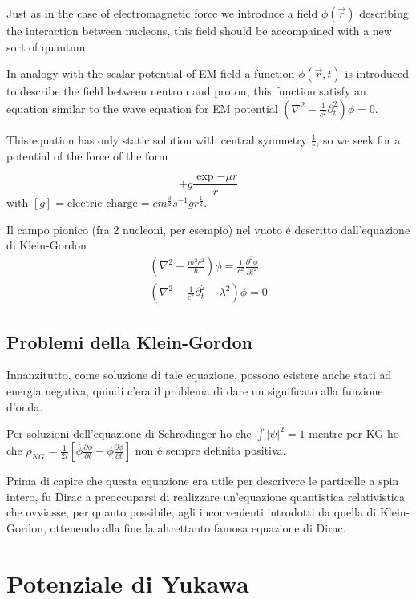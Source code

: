 \documentclass[main.tex]{subfiles}
\begin{document}
Just as in the case of electromagnetic force we introduce a field $\phi(\vec{r})$ describing the interaction between nucleons, this field should be accompained with a new sort of quantum.

In analogy with the scalar potential of EM field a function $\phi(\vec{r},t)$  is introduced to describe the field between neutron and proton, this function satisfy an equation similar to the wave equation for EM potential $(\nabla^2-\frac{1}{c^2}\partial^2_t)\phi=0$. 

This equation has only static solution with central symmetry $\frac{1}{r}$, so we seek for a potential of the force of the form

\begin{equation*}
\pm g\frac{\exp{-\mu r}}{r}
\end{equation*}
with $[g]=\text{electric charge}=cm^{\frac{3}{2}}s^{-1}gr^{\frac{1}{2}}$.

Il campo pionico (fra 2 nucleoni, per esempio) nel vuoto \'e descritto dall'equazione di Klein-Gordon
\begin{align*}
(\nabla^2-\frac{m^2c^2}{\hbar})\phi=\frac{1}{c^2}\frac{\partial^2\phi}{\partial t^2}\\
(\nabla^2-\frac{1}{c^2}\partial^2_t-\lambda^2)\phi=0
\end{align*}

\subsection{Problemi della Klein-Gordon}
Innanzitutto, come soluzione di tale equazione, possono esistere anche stati ad energia negativa, quindi c'era il problema di dare un significato alla funzione d'onda.

Per soluzioni dell'equazione di Schr\"odinger ho che $\int|\psi|^2=1$ mentre per KG ho che $\rho_{KG}=\frac{1}{2i}[\overline{\phi}\frac{\partial \phi}{\partial t}-\phi\frac{\partial\overline{\phi}}{\partial t}]$ non \'e sempre definita positiva.

Prima di capire che questa equazione era utile per descrivere le particelle a spin intero, fu Dirac a preoccuparsi di realizzare un'equazione quantistica relativistica che ovviasse, per quanto possibile, agli inconvenienti introdotti da quella di Klein-Gordon, ottenendo alla fine la altrettanto famosa equazione di Dirac.

\section{Potenziale di Yukawa}
\end{document}
